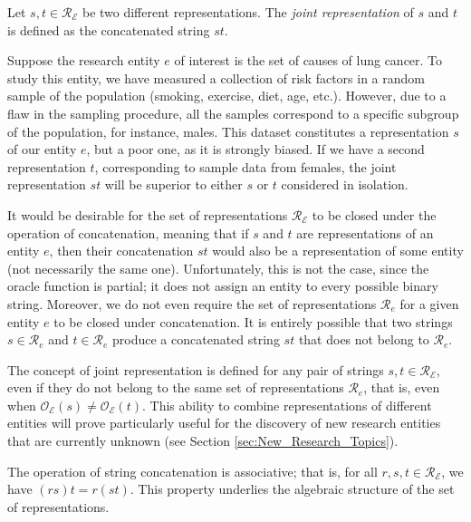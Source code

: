 \begin{definition}
Let $s, t \in \mathcal{R}_\mathcal{E}$ be two different representations. The \emph{joint representation} of $s$ and $t$ is defined as the concatenated string $st$.
\end{definition}

\begin{example}
\label{ex:lung_cancer}
Suppose the research entity $e$ of interest is the set of causes of lung cancer. To study this entity, we have measured a collection of risk factors in a random sample of the population (smoking, exercise, diet, age, etc.). However, due to a flaw in the sampling procedure, all the samples correspond to a specific subgroup of the population, for instance, males. This dataset constitutes a representation $s$ of our entity $e$, but a poor one, as it is strongly biased. If we have a second representation $t$, corresponding to sample data from females, the joint representation $st$ will be superior to either $s$ or $t$ considered in isolation.
\end{example}

It would be desirable for the set of representations $\mathcal{R}_\mathcal{E}$ to be closed under the operation of concatenation, meaning that if $s$ and $t$ are representations of an entity $e$, then their concatenation $st$ would also be a representation of some entity (not necessarily the same one). Unfortunately, this is not the case, since the oracle function is partial; it does not assign an entity to every possible binary string. Moreover, we do not even require the set of representations $\mathcal{R}_e$ for a given entity $e$ to be closed under concatenation. It is entirely possible that two strings $s \in \mathcal{R}_e$ and $t \in \mathcal{R}_e$ produce a concatenated string $st$ that does not belong to $\mathcal{R}_e$.

The concept of joint representation is defined for any pair of strings $s, t \in \mathcal{R}_\mathcal{E}$, even if they do not belong to the same set of representations $\mathcal{R}_e$, that is, even when $\mathcal{O}_\mathcal{E}(s) \neq \mathcal{O}_\mathcal{E}(t)$. This ability to combine representations of different entities will prove particularly useful for the discovery of new research entities that are currently unknown (see Section \ref{sec:New_Research_Topics}).

The operation of string concatenation is associative; that is, for all $r, s, t \in \mathcal{R}_\mathcal{E}$, we have $(rs)t = r(st)$. This property underlies the algebraic structure of the set of representations.

